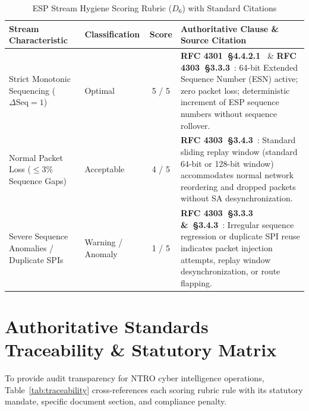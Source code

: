 \documentclass[11pt,a4paper]{article}
\begin{document}
\begin{table}[h!]
\centering
\small
\begin{tabularx}{\textwidth}{llcX}
\toprule
\textbf{Stream Characteristic} & \textbf{Classification} & \textbf{Score} & \textbf{Authoritative Clause \& Source Citation} \\
\midrule
Strict Monotonic Sequencing ($\Delta \text{Seq} = 1$) & Optimal & 5 / 5 & \textbf{RFC 4301~\S 4.4.2.1}~\cite{rfc4301} \& \textbf{RFC 4303~\S 3.3.3}~\cite{rfc4303}: 64-bit Extended Sequence Number (ESN) active; zero packet loss; deterministic increment of ESP sequence numbers without sequence rollover. \\
\addlinespace
Normal Packet Loss ($\le 3\%$ Sequence Gaps) & Acceptable & 4 / 5 & \textbf{RFC 4303~\S 3.4.3}~\cite{rfc4303}: Standard sliding replay window (standard 64-bit or 128-bit window) accommodates normal network reordering and dropped packets without SA desynchronization. \\
\addlinespace
Severe Sequence Anomalies / Duplicate SPIs & Warning / Anomaly & 1 / 5 & \textbf{RFC 4303~\S 3.3.3 \&~\S 3.4.3}~\cite{rfc4303}: Irregular sequence regression or duplicate SPI reuse indicates packet injection attempts, replay window desynchronization, or route flapping. \\
\bottomrule
\end{tabularx}
\caption{ESP Stream Hygiene Scoring Rubric ($D_6$) with Standard Citations}
\label{tab:d6}
\end{table}

\section{Authoritative Standards Traceability \& Statutory Matrix}
To provide audit transparency for NTRO cyber intelligence operations, Table~\ref{tab:traceability} cross-references each scoring rubric rule with its statutory mandate, specific document section, and compliance penalty.
\end{document}
